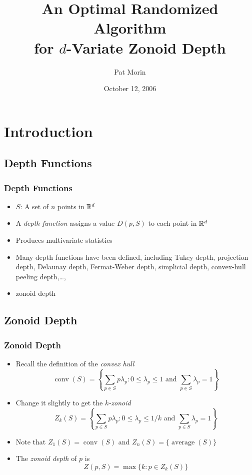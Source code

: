 \documentclass{beamer}
\title{An Optimal Randomized Algorithm \\ 
	for $d$-Variate Zonoid Depth}
\author{Pat Morin}
\institute{Carleton University}
\date{October 12, 2006}
\DeclareMathOperator{\conv}{conv}
\DeclareMathOperator{\average}{average}
\begin{document}
\frame{\titlepage}

\section[Outline]{}
\frame{\tableofcontents}

\section{Introduction}
\subsection{Depth Functions}
\frame
{
  \frametitle{Depth Functions}
  \begin{itemize}
  \item<1-> $S$: A set of $n$ points in $\mathbb{R}^d$
  \item<2-> A \emph{depth function} assigns a value $D(p,S)$ to each point in $\mathbb{R}^d$
  \item<3-> Produces multivariate statistics
  \item<4-> Many depth functions have been defined, including Tukey depth,
projection depth, Delaunay depth, Fermat-Weber depth, simplicial
depth, convex-hull peeling depth,\ldots,
  \item<5->zonoid depth
  \end{itemize}
}
    
\subsection{Zonoid Depth}
\frame
{
   \frametitle{Zonoid Depth}
   \begin{itemize}
   \item<1-> Recall the definition of the \emph{convex hull}
    \[ \conv(S) = \left\{\sum_{p\in S} p\lambda_p : 
         \mbox{$0\le\lambda_p\le 1$ and $\sum_{p\in S}\lambda_p = 1$} 
        \right\} 
    \]
   \item<2-> Change it slightly to get the \emph{$k$-zonoid}
    \[ Z_k(S) = \left\{\sum_{p\in S} p\lambda_p : 
         \mbox{$0\le\lambda_p\le 1/k$ and $\sum_{p\in S}\lambda_p = 1$} 
        \right\} 
    \]
   \item<3-> Note that $Z_1(S)=\conv(S)$ and $Z_n(S)=\{\average(S)\}$ 
   \item<4-> The \emph{zonoid depth} of $p$ is 
     \[ Z(p,S)=\max\{k : p\in Z_k(S)\} \]
   \end{itemize}
}
\end{document}
